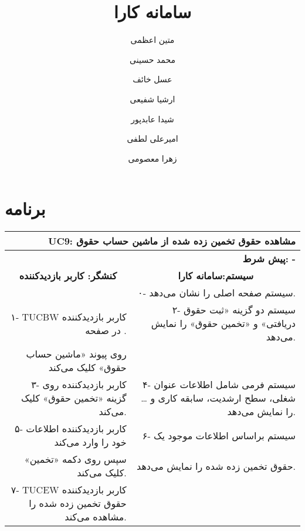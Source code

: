 \documentclass[12pt]{article}
\author{متین اعظمی}
\author{محمد حسینی}
\author{عسل خائف}
\author{ارشیا شفیعی}
\author{شیدا عابدپور}
\author{امیرعلی لطفی}
\author{زهرا معصومی}
\title{سامانه کارا}
\begin{document}
	
	\section{برنامه}
	
	\begin{table}[]
		\begin{tabular}{rr}
			\hline
			\multicolumn{2}{|r|}{\textbf{UC9: مشاهده حقوق تخمین زده شده از ماشین حساب حقوق}} \\
			\hline
			\multicolumn{2}{|r|}{\textbf{پیش شرط: -}} \\
			\hline
			\multicolumn{1}{|c|}{\textbf{کنشگر: کاربر بازدیدکننده}} & \multicolumn{1}{c|}{\textbf{سیستم:سامانه کارا}} \\
			\hline
			\multicolumn{1}{|c|}{\textbf{}} & \multicolumn{1}{r|}{۰-  سیستم صفحه اصلی را نشان می‌دهد.} \\
			\hline
			\multicolumn{1}{|r|}{۱- TUCBW کاربر بازدیدکننده در صفحه  .} & \multicolumn{1}{r|}{۲- سیستم دو گزینه «ثبت حقوق دریافتی» و «تخمین حقوق» را نمایش می‌دهد.} \\
			\multicolumn{1}{|r|}{روی پیوند «ماشین حساب حقوق» کلیک می‌کند} & \multicolumn{1}{r|}{} \\
			\hline
			\multicolumn{1}{|r|}{۳- کاربر بازدیدکننده روی گزینه «تخمین حقوق» کلیک می‌کند.} & \multicolumn{1}{r|}{۴- سیستم فرمی شامل اطلاعات عنوان شغلی، سطح ارشدیت، سابقه کاری و … را نمایش می‌دهد.} \\
			\hline
			۵- کاربر بازدیدکننده اطلاعات خود را وارد می‌کند  & ۶- سیستم براساس اطلاعات موجود یک \\
			سپس روی دکمه «تخمین» کلیک می‌کند. & حقوق تخمین زده شده را نمایش می‌دهد.\\
			\hline
			۷- TUCEW کاربر بازدیدکننده حقوق تخمین زده شده را مشاهده می‌کند. & \multicolumn{1}{l}{}                                                                                   
		\end{tabular}
	\end{table}
	
\end{document}

